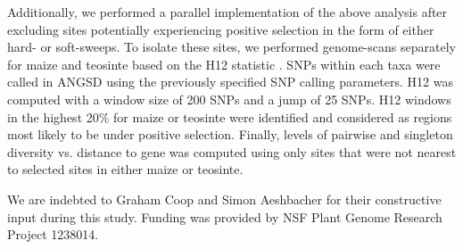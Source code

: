 \documentclass{pnastwo}
\begin{document}
\begin{article}
\begin{materials}
Additionally, we performed a parallel implementation of the above analysis after excluding sites potentially experiencing positive selection in the form of either hard- or soft-sweeps. To isolate these sites, we performed genome-scans separately for maize and teosinte based on the H12 statistic \cite{garud2015}. SNPs within each taxa were called in ANGSD \cite{korneliussen2014} using the previously specified SNP calling parameters. H12 was computed with a window size of 200 SNPs and a jump of 25 SNPs. H12 windows in the highest 20\% for maize or teosinte were identified and considered as regions most likely to be under positive selection. Finally, levels of pairwise and singleton diversity vs. distance to gene was computed using only sites that were not nearest to selected sites in either maize or teosinte.



\end{materials}

\begin{acknowledgments}
We are indebted to Graham Coop and Simon Aeshbacher for their constructive input during this study. Funding was provided by NSF Plant Genome Research Project 1238014.
\end{acknowledgments}




\onecolumn
 


\end{article}
\end{document}

